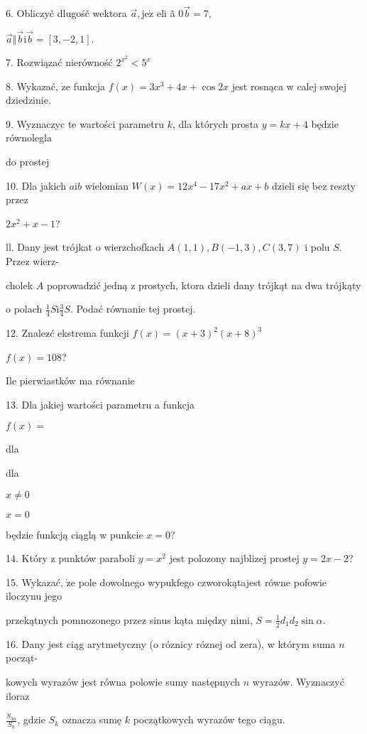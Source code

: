 \documentclass[a4paper,12pt]{article}
\begin{document}
6. Obliczyč dlugośč wektora $\vec{a}, \mathrm{j}\mathrm{e}\dot{\mathrm{z}}$ eli ã $0\vec{b}=7,$

$\vec{a}\Vert\vec{b} \mathrm{i} \vec{b}=[3,-2,1].$

7. Rozwiązać nierówność $2^{x^{2}}<5^{x}$

8. Wykazać, $\dot{\mathrm{z}}\mathrm{e}$ funkcja $f(x)=3x^{3}+4x+\cos 2x$ jest rosnąca w calej swojej dziedzinie.

9. Wyznaczyc te wartości parametru $k$, dla których prosta $y=kx+4$ będzie równolegla

do prostej 

10. Dla jakich $a\mathrm{i}b$ wielomian $W(x)=12x^{4}-17x^{2}+ax+b$ dzieli się bez reszty przez

$2x^{2}+x-1$?

ll. Dany jest trójkat o wierzchofkach $A(1,1), B(-1,3), C(3,7)$ i polu $S$. Przez wierz-

cholek $A$ poprowadzić jedną z prostych, ktora dzieli dany trójkąt na dwa trójkąty

o polach $\displaystyle \frac{1}{4}S\mathrm{i}\frac{3}{4}S$. Podać równanie tej prostej.

12. Znalez$\acute{}$ć ekstrema funkcji $f(x) = (x+3)^{2}(x+8)^{3}$

$f(x)=108$?

Ile pierwiastków ma równanie

13. Dla jakiej wartości parametru a funkcja

$f(x)=$

dla

dla

$x\neq 0$

$x=0$

będzie funkcją ciąglą w punkcie $x=0$?

14. Który z punktów paraboli $y=x^{2}$ jest polozony najblizej prostej $y=2x-2$?




15. Wykazać, $\dot{\mathrm{z}}\mathrm{e}$ pole dowolnego wypukfego czworokątajest równe pofowie iloczynu jego

przekątnych pomnozonego przez sinus kąta między nimi, $S=\displaystyle \frac{1}{2}d_{1}d_{2}\sin\alpha.$

16. Dany jest ciąg arytmetyczny (o róznicy róznej od zera), w którym suma $n$ począt-

kowych wyrazów jest równa polowie sumy następnych $n$ wyrazów. Wyznaczyć iloraz

$\displaystyle \frac{S_{3n}}{S_{n}}$, gdzie $S_{k}$ oznacza sumę $k$ początkowych wyrazów tego ciągu.
\end{document}
